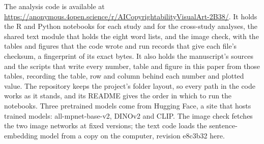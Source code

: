 The analysis code is available at \url{https://anonymous.4open.science/r/AICopyrightabilityVisualArt-2B38/}. It holds the R and Python notebooks for each study and for the cross-study analyses, the shared text module that holds the eight word lists, and the image check, with the tables and figures that the code wrote and run records that give each file's checksum, a fingerprint of its exact bytes. It also holds the manuscript's sources and the scripts that write every number, table and figure in this paper from those tables, recording the table, row and column behind each number and plotted value. The repository keeps the project's folder layout, so every path in the code works as it stands, and its README gives the order in which to run the notebooks. Three pretrained models come from Hugging Face, a site that hosts trained models: all-mpnet-base-v2, DINOv2 and CLIP. The image check fetches the two image networks at fixed versions; the text code loads the sentence-embedding model from a copy on the computer, revision e8c3b32 here.
